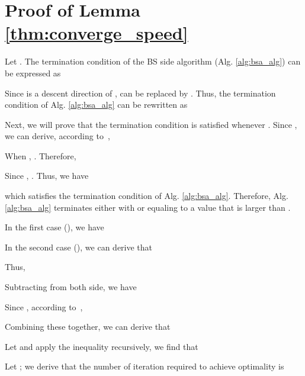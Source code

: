 \documentclass[journal]{IEEEtran}
\theoremstyle{definition}
\begin{document}
\appendices
\section{Proof of Lemma \ref{thm:converge_speed}}
\label{app:proof_converge_speed}
Let . The termination condition of the BS side algorithm (Alg. \ref{alg:bsa_alg}) can be expressed as

Since  is a descent direction of ,  can be replaced by . Thus, the termination condition of Alg. \ref{alg:bsa_alg} can be rewritten as

Next, we will prove that the termination condition is satisfied whenever . Since , we can derive, according to~\cite{Boyd:2004:CVX},

When , . Therefore,

Since , . Thus, we have

which satisfies the termination condition of Alg. \ref{alg:bsa_alg}. Therefore, Alg. \ref{alg:bsa_alg} terminates either with  or  equaling to a value that is larger than .

In the first case (), we have

In the second case (), we can derive that

Thus,

Subtracting  from both side, we have

Since , according to~\cite{Boyd:2004:CVX},

Combining these together, we can derive that

Let  and apply the inequality recursively, we find that

Let ; we derive that the number of iteration required to achieve  optimality is



\end{document}
